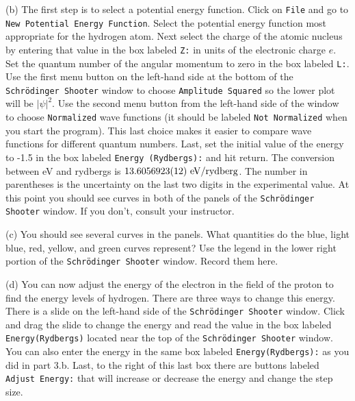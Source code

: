 (b) The first step is to select a potential energy function.
Click on {\tt File} and go to {\tt New Potential Energy Function}.
Select the potential energy function most appropriate for the hydrogen atom.
Next select the charge of the atomic nucleus by entering that value in the 
box labeled {\tt Z:} in units of the electronic charge $e$.
Set the quantum number of the angular momentum to zero in the box
labeled {\tt L:}.
Use the first menu button on the left-hand side at the bottom of the {\tt Schr\"odinger Shooter}
window to choose {\tt Amplitude Squared} so the lower plot will be $|\psi|^2$.
Use the second menu button from the left-hand side of the
window to choose {\tt Normalized} wave functions (it should be labeled {\tt Not Normalized}
when you start the program).
This last choice makes it easier to compare wave functions for different quantum numbers.
Last, set the initial value of the energy to -1.5 in the box labeled 
{\tt Energy (Rydbergs):} and hit return.
The conversion between eV and rydbergs is $\rm 13.605 6923(12)~ eV/rydberg$.
The number in parentheses is the uncertainty on the last two digits in the
experimental value.
At this point you should see curves in both of the panels of the 
{\tt Schr\"odinger Shooter} window.
If you don't, consult your instructor.

(c) You should see several curves in the panels.
What quantities do the blue, light blue, red, yellow, and green curves represent?
Use the legend in the lower right portion of the {\tt Schr\"odinger Shooter}
window.
Record them here.
\vspace{2.5cm}

\newpage

\vspace{-0.2in}

(d) You can now adjust the energy of the electron in the field of the proton to find 
the energy levels of hydrogen.
There are three ways to change this energy.
There is a slide on the left-hand side of the {\tt Schr\"odinger Shooter} window.
Click and drag the slide to change the energy and read the value
in the box labeled {\tt Energy(Rydbergs)} located near the top of the 
{\tt Schr\"odinger Shooter} window.
You can also enter the energy in the same box
labeled {\tt Energy(Rydbergs):} as you did in part 3.b.
Last, to the right of this last box there are buttons labeled
{\tt Adjust Energy:} that will increase or decrease the energy and change the step size.

